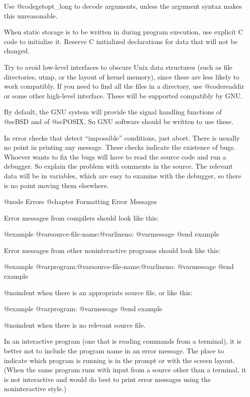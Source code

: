 Use @code{getopt_long} to decode arguments, unless the argument syntax
makes this unreasonable.

When static storage is to be written in during program execution, use
explicit C code to initialize it.  Reserve C initialized declarations
for data that will not be changed.

Try to avoid low-level interfaces to obscure Unix data structures (such
as file directories, utmp, or the layout of kernel memory), since these
are less likely to work compatibly.  If you need to find all the files
in a directory, use @code{readdir} or some other high-level interface.
These will be supported compatibly by GNU.

By default, the GNU system will provide the signal handling functions of
@sc{BSD} and of @sc{POSIX}.  So GNU software should be written to use
these.

In error checks that detect ``impossible'' conditions, just abort.
There is usually no point in printing any message.  These checks
indicate the existence of bugs.  Whoever wants to fix the bugs will have
to read the source code and run a debugger.  So explain the problem with
comments in the source.  The relevant data will be in variables, which
are easy to examine with the debugger, so there is no point moving them
elsewhere.


@node Errors
@chapter Formatting Error Messages

Error messages from compilers should look like this:

@example
@var{source-file-name}:@var{lineno}: @var{message}
@end example

Error messages from other noninteractive programs should look like this:

@example
@var{program}:@var{source-file-name}:@var{lineno}: @var{message}
@end example

@noindent
when there is an appropriate source file, or like this:

@example
@var{program}: @var{message}
@end example

@noindent
when there is no relevant source file.

In an interactive program (one that is reading commands from a
terminal), it is better not to include the program name in an error
message.  The place to indicate which program is running is in the
prompt or with the screen layout.  (When the same program runs with
input from a source other than a terminal, it is not interactive and
would do best to print error messages using the noninteractive style.)

